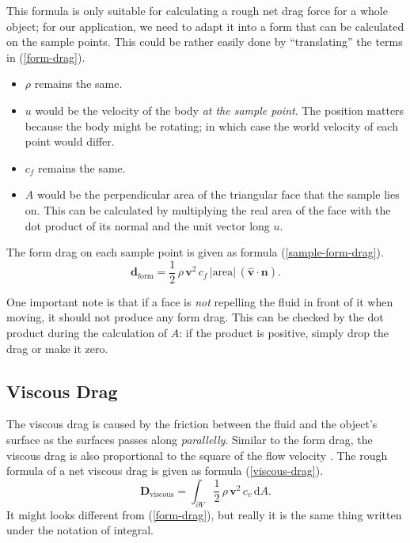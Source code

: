 This formula is only suitable for calculating a rough net drag force for a whole object;
for our application, we need to adapt it into a form that can be calculated on the sample points.
This could be rather easily done by ``translating'' the terms in (\ref{form-drag}).
\begin{itemize}
	\item $\rho$ remains the same.
	\item $u$ would be the velocity of the body \emph{at the sample point}.
		The position matters because the body might be rotating; in which case the world velocity of each point would differ.
	\item $c_f$ remains the same.
	\item $A$ would be the perpendicular area of the triangular face that the sample lies on.
		This can be calculated by multiplying the real area of the face with the dot product of its normal and the unit vector long $u$.
\end{itemize}

The form drag on each sample point is given as formula (\ref{sample-form-drag}).
\begin{equation}
	\mathbf{d}_{\text{form}}=\frac{1}{2}\,\rho\,\mathbf{v}^2\,c_f\,|\text{area}|\,(\hat{\mathbf{v}}\cdot\mathbf{n}).
	\label{sample-form-drag}
\end{equation}

One important note is that if a face is \emph{not} repelling the fluid in front of it when moving, it should not produce any form drag.
This can be checked by the dot product during the calculation of $A$: if the product is positive, simply drop the drag or make it zero.

\subsection{Viscous Drag}

The viscous drag is caused by the friction between the fluid and the object's surface as the surfaces passes along \emph{parallelly}.
Similar to the form drag, the viscous drag is also proportional to the square of the flow velocity \cite{trouton1906coefficient}.
The rough formula of a net viscous drag is given as formula (\ref{viscous-drag}).
\begin{equation}
	\mathbf{D}_{\text{viscous}}=\int_{\partial V}\frac{1}{2}\,\rho\,\mathbf{v}^2\,c_v\,\text{d}A.
	\label{viscous-drag}
\end{equation}
It might looks different from (\ref{form-drag}), but really it is the same thing written under the notation of integral.

